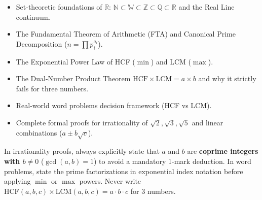 \documentclass[10pt,a4paper]{article}
\begin{document}
\vspace{2.5mm}
\begin{minipage}[t]{0.485\textwidth}
  \begin{conceptBox}[title=What this handbook includes,fonttitle=\bfseries\color{navy}]
    \begin{itemize}
      \item Set-theoretic foundations of $\mathbb{R}$: $\mathbb{N} \subset \mathbb{W} \subset \mathbb{Z} \subset \mathbb{Q} \subset \mathbb{R}$ and the Real Line continuum.
      \item The Fundamental Theorem of Arithmetic (FTA) and Canonical Prime Decomposition ($n = \prod p_i^{a_i}$).
      \item The Exponential Power Law of HCF ($\min$) and LCM ($\max$).
      \item The Dual-Number Product Theorem $\text{HCF} \times \text{LCM} = a \times b$ and why it strictly fails for three numbers.
      \item Real-world word problems decision framework (HCF vs LCM).
      \item Complete formal proofs for irrationality of $\sqrt{2}, \sqrt{3}, \sqrt{5}$ and linear combinations ($a \pm b\sqrt{c}$).
    \end{itemize}
  \end{conceptBox}
\end{minipage}\hfill
\begin{minipage}[t]{0.485\textwidth}
  \begin{formulaBox}[title=How to use it for maximum marks,fonttitle=\bfseries\color{navy}]
    \raggedright In irrationality proofs, always explicitly state that $a$ and $b$ are \textbf{coprime integers with $b \ne 0$} ($\gcd(a, b) = 1$) to avoid a mandatory 1-mark deduction. In word problems, state the prime factorizations in exponential index notation before applying $\min$ or $\max$ powers. Never write $\text{HCF}(a, b, c) \times \text{LCM}(a, b, c) = a \cdot b \cdot c$ for 3 numbers.
  \end{formulaBox}
\end{minipage}
\end{document}
